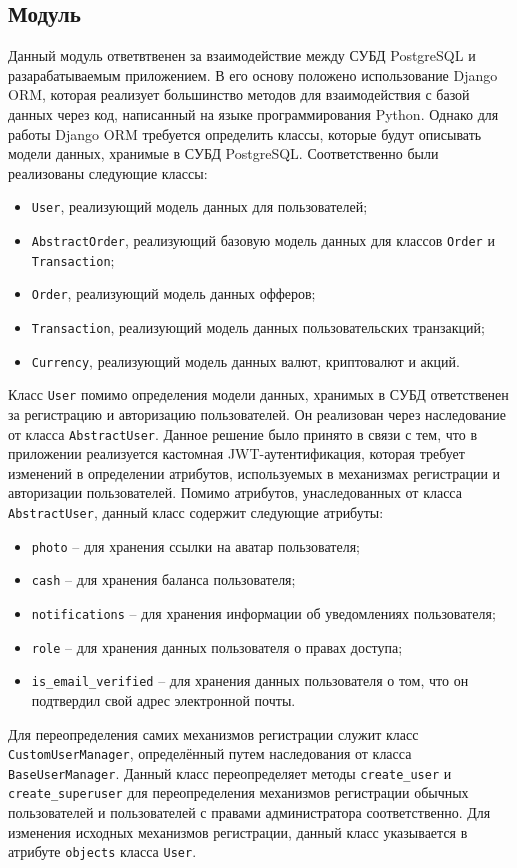 \subsection{Модуль \moduleCommunicationPostgres}\label{subsec:func:module-postgres}
Данный модуль ответвтвенен за взаимодействие между СУБД PostgreSQL и разарабатываемым приложением.
В его основу положено использование Django ORM, которая реализует большинство методов для взаимодействия с базой данных через код, написанный на языке программирования Python.
Однако для работы Django ORM требуется определить классы, которые будут описывать модели данных, хранимые в СУБД PostgreSQL.
Соответственно были реализованы следующие классы:
\begin{itemize}
    \item \lstinline{User}, реализующий модель данных для пользователей;
    \item \lstinline{AbstractOrder}, реализующий базовую модель данных для классов \lstinline{Order} и \lstinline{Transaction};
    \item \lstinline{Order}, реализующий модель данных офферов;
    \item \lstinline{Transaction}, реализующий модель данных пользовательских транзакций;
    \item \lstinline{Currency}, реализующий модель данных валют, криптовалют и акций.
\end{itemize}
Класс \lstinline{User} помимо определения модели данных, хранимых в СУБД ответственен за регистрацию и авторизацию пользователей.
Он реализован через наследование от класса \lstinline{AbstractUser}.
Данное решение было принято в связи с тем, что в приложении реализуется кастомная JWT-аутентификация,
которая требует изменений в определении атрибутов, используемых в механизмах регистрации и авторизации пользователей.
Помимо атрибутов, унаследованных от класса \lstinline{AbstractUser}, данный класс содержит следующие атрибуты:
\begin{itemize}
    \item \lstinline{photo} -- для хранения ссылки на аватар пользователя;
    \item \lstinline{cash} -- для хранения баланса пользователя;
    \item \lstinline{notifications} -- для хранения информации об уведомлениях пользователя;
    \item \lstinline{role} -- для хранения данных пользователя о правах доступа;
    \item \lstinline{is_email_verified} -- для хранения данных пользователя о том, что он подтвердил свой адрес электронной почты.
\end{itemize}
Для переопределения самих механизмов регистрации служит класс \lstinline{CustomUserManager}, определённый путем наследования от класса \lstinline{BaseUserManager}.
Данный класс переопределяет методы \lstinline{create_user} и \lstinline{create_superuser}
для переопределения механизмов регистрации обычных пользователей и пользователей с правами администратора соответственно.
Для изменения исходных механизмов регистрации, данный класс указывается в атрибуте \lstinline{objects} класса \lstinline{User}.

